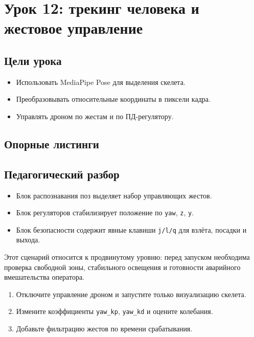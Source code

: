 \section{Урок 12: трекинг человека и жестовое управление}

\subsection{Цели урока}
\begin{itemize}
\item Использовать MediaPipe Pose для выделения скелета.
\item Преобразовывать относительные координаты в пиксели кадра.
\item Управлять дроном по жестам и по ПД-регулятору.
\end{itemize}

\subsection{Опорные листинги}



\subsection{Педагогический разбор}
\begin{itemize}
\item Блок распознавания поз выделяет набор управляющих жестов.
\item Блок регуляторов стабилизирует положение по \texttt{yaw}, \texttt{z}, \texttt{y}.
\item Блок безопасности содержит явные клавиши \texttt{j/l/q} для взлёта, посадки и выхода.
\end{itemize}

\begin{warnbox}
Этот сценарий относится к продвинутому уровню: перед запуском необходима проверка свободной зоны, стабильного освещения и готовности аварийного вмешательства оператора.
\end{warnbox}

\begin{taskbox}
\begin{enumerate}
\item Отключите управление дроном и запустите только визуализацию скелета.
\item Измените коэффициенты \texttt{yaw\_kp}, \texttt{yaw\_kd} и оцените колебания.
\item Добавьте фильтрацию жестов по времени срабатывания.
\end{enumerate}
\end{taskbox}

